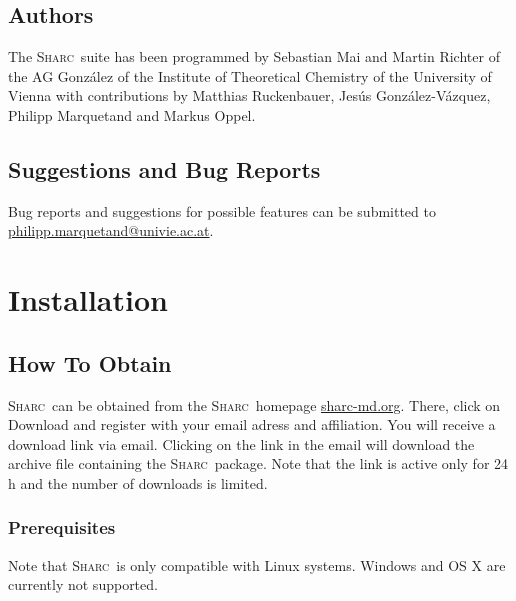\documentclass[a4paper,11pt,DIV=15,openany,twoside=false]{scrbook}
\newcommand{\sharc}{\textsc{Sharc}}
\newenvironment{example}{
  \vspace{0mm}
  \definecolor{shadecolor}{HTML}{BBDDFF}
  \begin{shaded}
  \begin{minipage}{0.9\textwidth}
}{
  \end{minipage}
  \end{shaded}
}
\begin{document}
\section{Authors}

The \sharc\ suite has been programmed by Sebastian Mai and Martin Richter of the AG Gonz\'alez of the Institute of Theoretical Chemistry of the University of Vienna with contributions by Matthias Ruckenbauer, Jes\'us Gonz\'alez-V\'azquez, Philipp Marquetand and Markus Oppel.

\section{Suggestions and Bug Reports}

\begin{example}
Bug reports and suggestions for possible features can be submitted to \href{mailto:philipp.marquetand@univie.ac.at}{philipp.marquetand@univie.ac.at}.
\end{example}


\chapter{Installation}

\section{How To Obtain}

\sharc\ can be obtained from the \sharc\ homepage \href{http://sharc-md.org}{sharc-md.org}. There, click on Download and register with your email adress and affiliation. You will receive a download link via email. Clicking on the link in the email will download the archive file containing the \sharc\ package. Note that the link is active only for 24 h and the number of downloads is limited.

\subsection{Prerequisites}

Note that \sharc\ is only compatible with Linux systems. Windows and OS X are currently not supported. 
\end{document}
